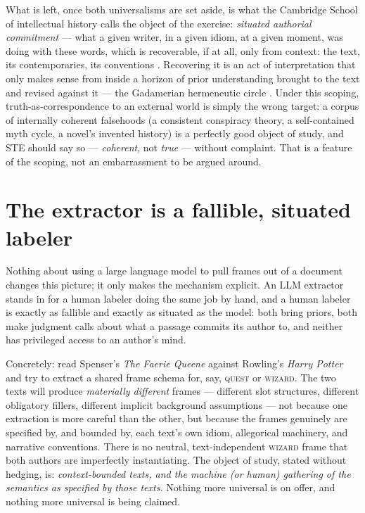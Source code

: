 \documentclass[11pt]{article}
\begin{document}
What is left, once both universalisms are set aside, is what the
Cambridge School of intellectual history calls the object of the
exercise: \emph{situated authorial commitment} --- what a given writer,
in a given idiom, at a given moment, was doing with these words, which
is recoverable, if at all, only from context: the text, its
contemporaries, its conventions \citep{skinner1969meaning}. Recovering
it is an act of interpretation that only makes sense from inside a
horizon of prior understanding brought to the text and revised against
it --- the Gadamerian hermeneutic circle
\citep{gadamer1960truth}. Under this scoping, truth-as-correspondence
to an external world is simply the wrong target: a corpus of internally
coherent falsehoods (a consistent conspiracy theory, a self-contained
myth cycle, a novel's invented history) is a perfectly good object of
study, and STE should say so --- \emph{coherent}, not \emph{true} ---
without complaint. That is a feature of the scoping, not an
embarrassment to be argued around.

\section{The extractor is a fallible, situated labeler}
\label{sec:extractor}

Nothing about using a large language model to pull frames out of a
document changes this picture; it only makes the mechanism explicit.
An LLM extractor stands in for a human labeler doing the same job by
hand, and a human labeler is exactly as fallible and exactly as
situated as the model: both bring priors, both make judgment calls
about what a passage commits its author to, and neither has privileged
access to an author's mind.

Concretely: read Spenser's \emph{The Faerie Queene} against Rowling's
\emph{Harry Potter} and try to extract a shared frame schema for, say,
\textsc{quest} or \textsc{wizard}. The two texts will produce
\emph{materially different} frames --- different slot structures,
different obligatory fillers, different implicit background
assumptions --- not because one extraction is more careful than the
other, but because the frames genuinely are specified by, and bounded
by, each text's own idiom, allegorical machinery, and narrative
conventions. There is no neutral, text-independent \textsc{wizard}
frame that both authors are imperfectly instantiating. The object of
study, stated without hedging, is: \emph{context-bounded texts, and the
machine (or human) gathering of the semantics as specified by those
texts.} Nothing more universal is on offer, and nothing more universal
is being claimed.
\end{document}
